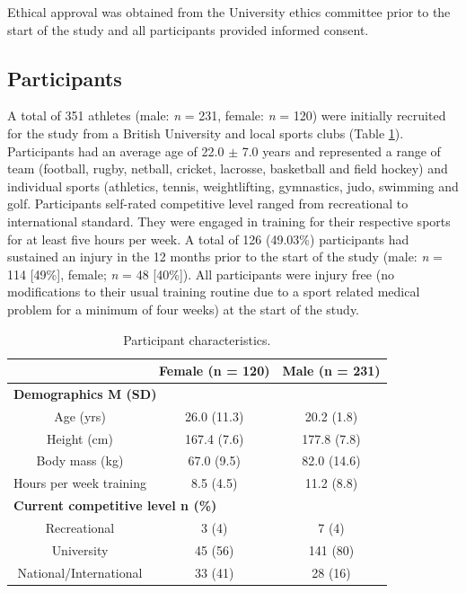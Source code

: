 \documentclass[
  english,
  man,floatsintext]{apa6}
\begin{document}
Ethical approval was obtained from the University ethics committee prior to the start of the study and all participants provided informed consent.

\hypertarget{participants}{%
\subsection{Participants}\label{participants}}

A total of 351 athletes (male: \emph{n} = 231, female: \emph{n} = 120) were initially recruited for the study from a British University and local sports clubs (Table \ref{tab:table1}). Participants had an average age of 22.0 \(\pm\) 7.0 years and represented a range of team (football, rugby, netball, cricket, lacrosse, basketball and field hockey) and individual sports (athletics, tennis, weightlifting, gymnastics, judo, swimming and golf.
Participants self-rated competitive level ranged from recreational to international standard.
They were engaged in training for their respective sports for at least five hours per week.
A total of 126 (49.03\%) participants had sustained an injury in the 12 months prior to the start of the study (male: \emph{n} = 114 {[}49\%{]}, female; \emph{n} = 48 {[}40\%{]}).
All participants were injury free (no modifications to their usual training routine due to a sport related medical problem for a minimum of four weeks) at the start of the study.

\begin{table}[H]

\caption{\label{tab:table1}Participant characteristics.}
\centering
\begin{tabular}[t]{c|c|c}
\hline
\textbf{ } & \textbf{Female (n = 120)} & \textbf{Male (n = 231)}\\
\hline
\multicolumn{3}{l}{\textbf{Demographics M (SD)}}\\
\hline
\hspace{1em}Age (yrs) & 26.0 (11.3) & 20.2 (1.8)\\
\hline
\hspace{1em}Height (cm) & 167.4 (7.6) & 177.8 (7.8)\\
\hline
\hspace{1em}Body mass (kg) & 67.0 (9.5) & 82.0 (14.6)\\
\hline
\hspace{1em}Hours per week training & 8.5 (4.5) & 11.2 (8.8)\\
\hline
\multicolumn{3}{l}{\textbf{Current competitive level n (\%)}}\\
\hline
\hspace{1em}Recreational & 3 (4) & 7 (4)\\
\hline
\hspace{1em}University & 45 (56) & 141 (80)\\
\hline
\hspace{1em}National/International & 33 (41) & 28 (16)\\
\hline
\end{tabular}
\end{table}
\end{document}
